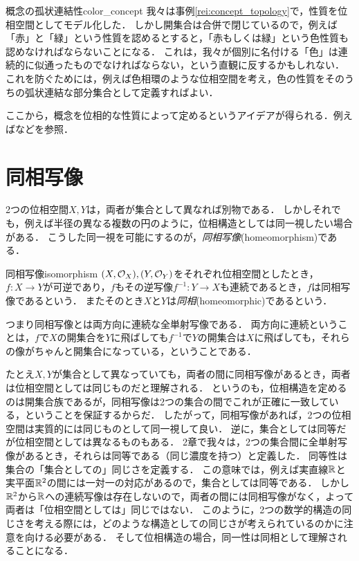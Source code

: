 \documentclass[11pt,a4paper, dvipdfmx]{jsarticle}
\begin{document}
\begin{rei}{概念の孤状連結性}{color_concept}
我々は事例\ref{rei:concept_topology}で，性質を位相空間としてモデル化した．
しかし開集合は合併で閉じているので，例えば「赤」と「緑」という性質を認めるとすると，「赤もしくは緑」という色性質も認めなければならないことになる．
これは，我々が個別に名付ける「色」は連続的に似通ったものでなければならない，という直観に反するかもしれない．
これを防ぐためには，例えば色相環のような位相空間を考え，色の性質をそのうちの弧状連結な部分集合として定義すればよい．
 \begin{center}
 \end{center}
ここから，概念を位相的な性質によって定めるというアイデアが得られる．例えば\cite{Mormann1993-fd, Gardenfors2004-vz}などを参照．
\end{rei}


\section{同相写像}
2つの位相空間$X, Y$は，両者が集合として異なれば別物である．
しかしそれでも，例えば半径の異なる複数の円のように，位相構造としては同一視したい場合がある．
こうした同一視を可能にするのが，\emph{同相写像}(homeomorphism)である．


\begin{dfn}{同相写像}{isomorphism}
  $(X, \mathcal{O}_X), (Y, \mathcal{O}_Y)$をそれぞれ位相空間としたとき，$f:X \to Y$が可逆であり，$f$もその逆写像$f^{-1}:Y \to X$も連続であるとき，$f$は同相写像であるという．
  またそのとき$X$と$Y$は\emph{同相}(homeomorphic)であるという．
\end{dfn}

つまり同相写像とは両方向に連続な全単射写像である．
両方向に連続ということは，$f$で$X$の開集合を$Y$に飛ばしても$f^{-1}$で$Y$の開集合は$X$に飛ばしても，それらの像がちゃんと開集合になっている，ということである．

たとえ$X, Y$が集合として異なっていても，両者の間に同相写像があるとき，両者は位相空間としては同じものだと理解される．
というのも，位相構造を定めるのは開集合族であるが，同相写像は2つの集合の間でこれが正確に一致している，ということを保証するからだ．
したがって，同相写像があれば，2つの位相空間は実質的には同じものとして同一視して良い．
逆に，集合としては同等だが位相空間としては異なるものもある．
2章で我々は，2つの集合間に全単射写像があるとき，それらは同等である（同じ濃度を持つ）と定義した．
同等性は集合の「集合としての」同じさを定義する．
この意味では，例えば実直線$\mathbb{R}$と実平面$\mathbb{R}^2$の間には一対一の対応があるので，集合としては同等である．
しかし$\mathbb{R}^2$から$\mathbb{R}$への連続写像は存在しないので，両者の間には同相写像がなく，よって両者は「位相空間としては」同じではない．
このように，2つの数学的構造の同じさを考える際には，どのような構造としての同じさが考えられているのかに注意を向ける必要がある．
そして位相構造の場合，同一性は同相として理解されることになる．
\end{document}
